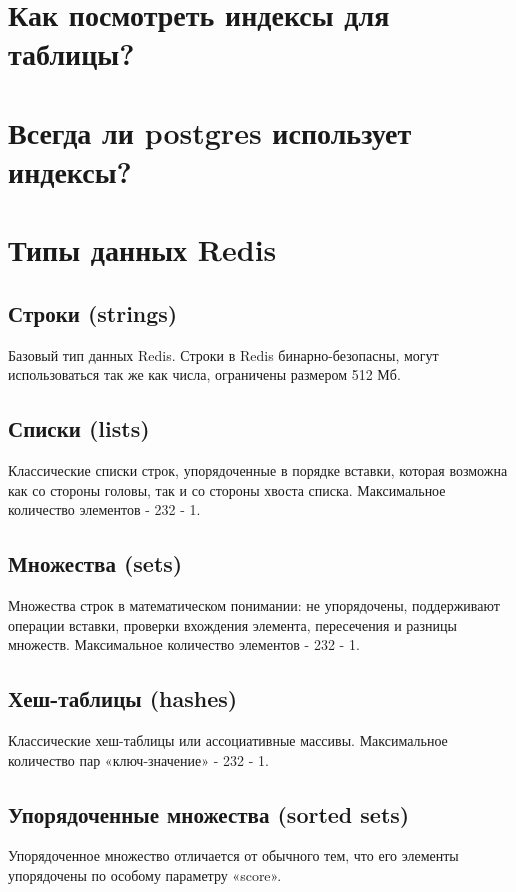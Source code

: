 \section{Как посмотреть индексы для таблицы?}
\section{Всегда ли postgres использует индексы?}

\section{Типы данных Redis}

\subsection{Строки (strings)}
Базовый тип данных Redis. Строки в Redis бинарно-безопасны, могут использоваться так же как числа, ограничены размером 512 Мб.
\subsection{Списки (lists)}
Классические списки строк, упорядоченные в порядке вставки, которая возможна как со стороны головы, так и со стороны хвоста списка. Максимальное количество элементов - 232 - 1.
\subsection{Множества (sets)}    
Множества строк в математическом понимании: не упорядочены, поддерживают операции вставки, проверки вхождения элемента, пересечения и разницы множеств. Максимальное количество элементов - 232 - 1.
\subsection{Хеш-таблицы (hashes)}    
Классические хеш-таблицы или ассоциативные массивы. Максимальное количество пар «ключ-значение» - 232 - 1.
\subsection{Упорядоченные множества (sorted sets)}
Упорядоченное множество отличается от обычного тем, что его элементы упорядочены по особому параметру «score».